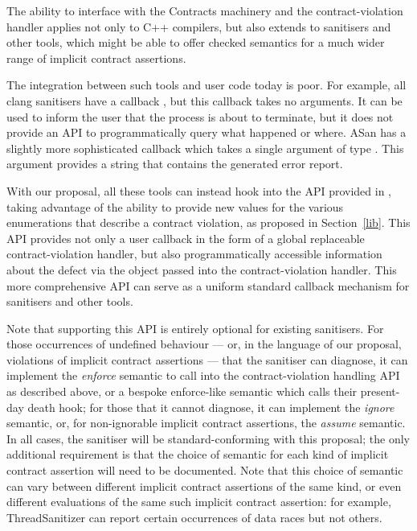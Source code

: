 The ability to interface with the Contracts machinery and the contract-violation handler applies not only to C++ compilers, but also extends to sanitisers and other tools, which might be able to offer checked semantics for a much wider range of implicit contract assertions.

The integration between such tools and user code today is poor. For example, all clang sanitisers have a callback , but this callback takes no arguments. It can be used to inform the user that the process is about to terminate, but it does not provide an API to programmatically query what happened or where. ASan has a slightly more sophisticated callback  which takes a single argument of type . This argument provides a string that contains the generated error report.

With our proposal, all these tools can instead hook into the API provided in \cite{P2900R9}, taking advantage of the ability to provide new values for the various enumerations that describe a contract violation, as proposed in Section~\ref{lib}. This API provides not only a user callback in the form of a global replaceable contract-violation handler, but also programmatically accessible information about the defect via the  \mbox{} object passed into the contract-violation handler. This more comprehensive API can serve as a uniform standard callback mechanism for sanitisers and other tools.

Note that supporting this API is entirely optional for existing sanitisers. For those occurrences of undefined behaviour --- or, in the language of our proposal, violations of implicit contract assertions --- that the sanitiser can diagnose, it can implement the \emph{enforce} semantic to call into the contract-violation handling API as described above, or a bespoke enforce-like semantic which calls their present-day death hook; for those that it cannot diagnose, it can implement the \emph{ignore} semantic, or, for non-ignorable implicit contract assertions, the \emph{assume} semantic. In all cases, the sanitiser will be standard-conforming with this proposal; the only additional requirement is that the choice of semantic for each kind of implicit contract assertion will need to be documented. Note that this choice of semantic can vary between different implicit contract assertions of the same kind, or even different evaluations of the same such implicit contract assertion: for example, ThreadSanitizer can report certain occurrences of data races but not others.

